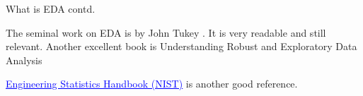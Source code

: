 \documentclass[11pt]{beamer}
\begin{document}
\begin{frame}{
	\begin{minipage}[t]{0.55\textwidth}
		What is EDA contd.
	\end{minipage}
	\hfill
	\begin{minipage}[t]{0.35\textwidth}
		\flushright
	\end{minipage}
}{}

	The seminal work on EDA is by John Tukey \parencite{tukey1977}. It is very readable and still relevant. Another excellent book is Understanding Robust and Exploratory Data Analysis \parencite{HoaglinUnderstandingrobustexploratory1983}  
	\vspace{0.5cm}
	
	 \href{http://www.itl.nist.gov/div898/handbook/eda/section1/eda11.htm}{\textcolor{blue}{\underline{Engineering Statistics Handbook (NIST)}}} is another good reference.

\end{frame}
\end{document}
